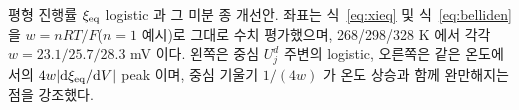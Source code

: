 \caption{평형 진행률 $\xi_\eq$ logistic 과 그 미분 종 개선안. 좌표는 식~\eqref{eq:xieq} 및 식~\eqref{eq:belliden} 을 $w=nRT/F$($n=1$ 예시)로 그대로 수치 평가했으며, 268/298/328 K 에서 각각 $w=23.1/25.7/28.3$ mV 이다. 왼쪽은 중심 $U_j^d$ 주변의 logistic, 오른쪽은 같은 온도에서의 $4w|\dd\xi_\eq/\dd V|$ peak 이며, 중심 기울기 $1/(4w)$ 가 온도 상승과 함께 완만해지는 점을 강조했다.}
\label{fig:logistic}
